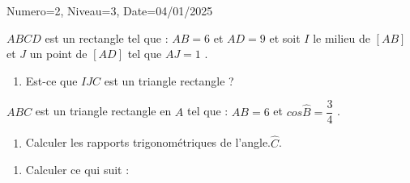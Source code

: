 \documentclass[a4paper,12pt]{article}
\begin{document}
\begin{Maquette}[DS]{Numero=2, Niveau=3, Date=04/01/2025}


\begin{exercice}[BaremeDetaille]
$ABCD$ est un rectangle tel que : $AB=6 $ et  $AD=9 $ et soit  $I$ le milieu de $[AB]$ et $J$ un point de  $[AD]$ tel que $AJ=1 $ .
\begin{enumerate}
\item{} Est-ce que  $IJC$ est un triangle rectangle ?
\end{enumerate}
\anserline[5]
\end{exercice}

\begin{exercice}[BaremeDetaille]
$ABC$ est un triangle rectangle en $A$ tel que : $AB=6$ et $cos\widehat{B}=\dfrac{3}{4}$ .
\begin{enumerate}
%
%
\item{} Calculer les rapports trigonométriques de l'angle.$\widehat{C}$.\newline
\anserline[8]
\end{enumerate}
\end{exercice}

\begin{exercice}[BaremeDetaille]
\begin{enumerate}
\item{} Calculer ce qui suit :


\end{enumerate}
\end{exercice}
\end{Maquette}
\end{document}

